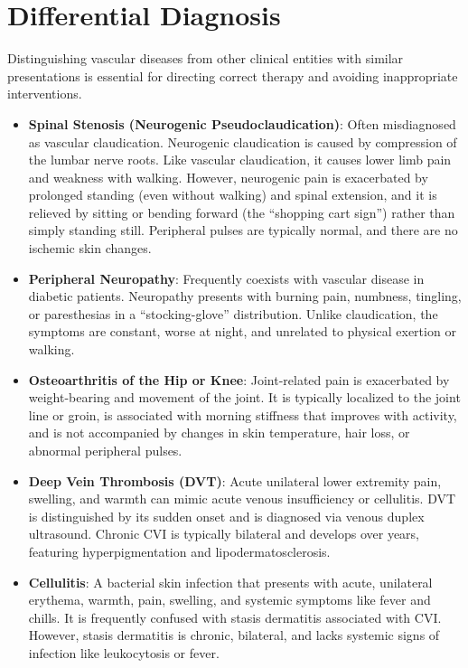 \section*{Differential Diagnosis}
Distinguishing vascular diseases from other clinical entities with similar presentations is essential for directing correct therapy and avoiding inappropriate interventions.

\begin{itemize}
    \item \textbf{Spinal Stenosis (Neurogenic Pseudoclaudication)}: Often misdiagnosed as vascular claudication. Neurogenic claudication is caused by compression of the lumbar nerve roots. Like vascular claudication, it causes lower limb pain and weakness with walking. However, neurogenic pain is exacerbated by prolonged standing (even without walking) and spinal extension, and it is relieved by sitting or bending forward (the ``shopping cart sign'') rather than simply standing still. Peripheral pulses are typically normal, and there are no ischemic skin changes.
    \item \textbf{Peripheral Neuropathy}: Frequently coexists with vascular disease in diabetic patients. Neuropathy presents with burning pain, numbness, tingling, or paresthesias in a ``stocking-glove'' distribution. Unlike claudication, the symptoms are constant, worse at night, and unrelated to physical exertion or walking.
    \item \textbf{Osteoarthritis of the Hip or Knee}: Joint-related pain is exacerbated by weight-bearing and movement of the joint. It is typically localized to the joint line or groin, is associated with morning stiffness that improves with activity, and is not accompanied by changes in skin temperature, hair loss, or abnormal peripheral pulses.
    \item \textbf{Deep Vein Thrombosis (DVT)}: Acute unilateral lower extremity pain, swelling, and warmth can mimic acute venous insufficiency or cellulitis. DVT is distinguished by its sudden onset and is diagnosed via venous duplex ultrasound. Chronic CVI is typically bilateral and develops over years, featuring hyperpigmentation and lipodermatosclerosis.
    \item \textbf{Cellulitis}: A bacterial skin infection that presents with acute, unilateral erythema, warmth, pain, swelling, and systemic symptoms like fever and chills. It is frequently confused with stasis dermatitis associated with CVI. However, stasis dermatitis is chronic, bilateral, and lacks systemic signs of infection like leukocytosis or fever.

\end{itemize}
